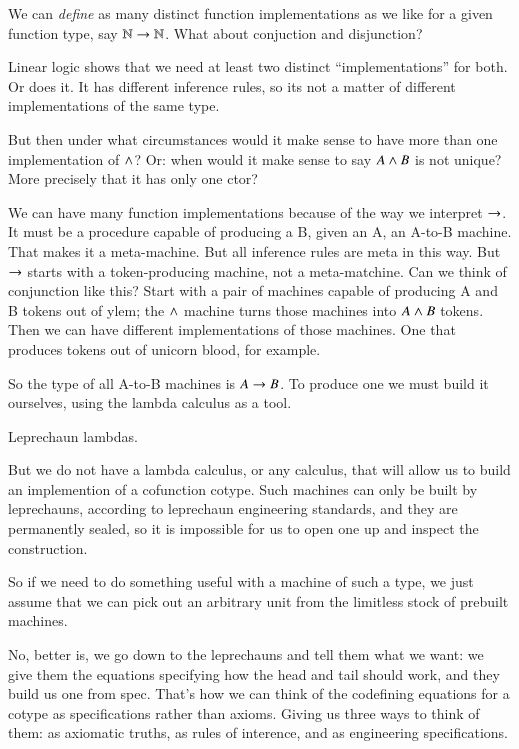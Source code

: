 \documentclass{article}
\begin{document}
We can \textit{define} as many distinct function implementations as we
like for a given function type, say \(\mathbb{N}\rightarrow\mathbb{N}\). What about
conjuction and disjunction?

Linear logic shows that we need at least two distinct
``implementations'' for both. Or does it. It has different inference
rules, so its not a matter of different implementations of the same
type.

But then under what circumstances would it make sense to have more
than one implementation of \(\land\)? Or: when would it make sense to
say \(A \land B\) is not unique? More precisely that it has only one
ctor?

We can have many function implementations because of the way we
interpret \(\rightarrow\). It must be a procedure capable of producing a B,
given an A, an A-to-B machine. That makes it a meta-machine. But all
inference rules are meta in this way. But \(\rightarrow\) starts with a
token-producing machine, not a meta-matchine. Can we think of
conjunction like this? Start with a pair of machines capable of
producing A and B tokens out of ylem; the \(\land\) machine turns
those machines into \(A\land B\) tokens. Then we can have different
implementations of those machines. One that produces tokens out of
unicorn blood, for example.

So the type of all A-to-B machines is \(A\rightarrow B\). To produce one we
must build it ourselves, using the lambda calculus as a tool.

Leprechaun lambdas.

But we do not have a lambda calculus, or any calculus, that will allow
us to build an implemention of a cofunction cotype. Such machines can
only be built by leprechauns, according to leprechaun engineering
standards, and they are permanently sealed, so it is impossible for us
to open one up and inspect the construction.

So if we need to do something useful with a machine of such a type, we
just assume that we can pick out an arbitrary unit from the limitless
stock of prebuilt machines.

No, better is, we go down to the leprechauns and tell them what we
want: we give them the equations specifying how the head and tail
should work, and they build us one from spec. That's how we can think
of the codefining equations for a cotype as specifications rather than
axioms. Giving us three ways to think of them: as axiomatic truths, as
rules of interence, and as engineering specifications.
\end{document}
